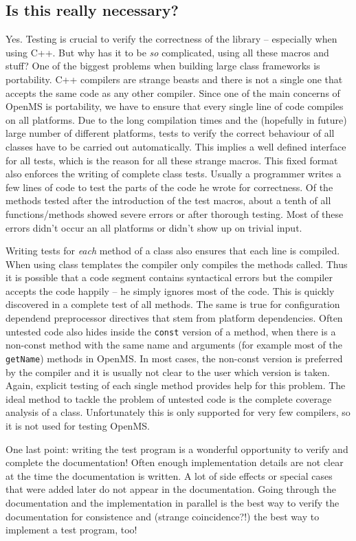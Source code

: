 \documentclass[a4]{article}
\begin{document}
\subsection{Is this really necessary?}

Yes. Testing is crucial to verify the correctness of the library -- especially when
using C++. But why has it to be {\em so} complicated, using all these macros
and stuff? One of the biggest problems when building large class frameworks is
portability. C++ compilers are strange beasts and there is not a single one
that accepts the same code as any other compiler. Since one of the main
concerns of OpenMS is portability, we have to ensure that every single line of
code compiles on all platforms. Due to the long compilation times and the
(hopefully in future) large number of different platforms, tests to verify the
correct behaviour of all classes have to be carried out automatically. This
implies a well defined interface for all tests, which is the reason for all
these strange macros. This fixed format also enforces the writing of complete
class tests. Usually a programmer writes a few lines of code to test the parts
of the code he wrote for correctness. Of the methods tested after the
introduction of the test macros, about a tenth of all functions/methods showed
severe errors or after thorough testing. Most of these errors didn't occur an
all platforms or didn't show up on trivial input.

Writing tests for {\em each} method of a class also ensures that each line is
compiled. When using class templates the compiler only compiles the methods
called. Thus it is possible that a code segment contains syntactical errors
but the compiler accepts the code happily -- he simply ignores most of the
code. This is quickly discovered in a complete test of all methods. The same
is true for configuration dependend preprocessor directives that stem from
platform dependencies. Often untested code also hides inside the {\tt const}
version of a method, when there is a non-const method with the same name and
arguments (for example most of the {\tt getName}) methods in OpenMS. In most
cases, the non-const version is preferred by the compiler and it is usually
not clear to the user which version is taken. Again, explicit testing of each
single method provides help for this problem.
The ideal method to tackle the problem of untested code is the complete
coverage analysis of a class. Unfortunately this is only supported for very
few compilers, so it is not used for testing OpenMS.

One last point: writing the
test program is a wonderful opportunity to verify and complete the
documentation! Often enough implementation details are not clear at the time
the documentation is written. A lot of side effects or special cases that were
added later do not appear in the documentation. Going through the
documentation and the implementation in parallel is the best way to verify the
documentation for consistence and (strange coincidence?!) the best way to
implement a test program, too!
\end{document}
